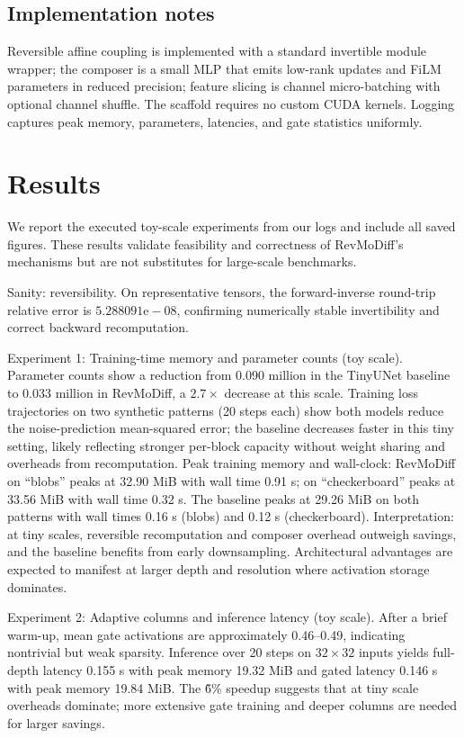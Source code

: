 \documentclass{article}
\begin{document}
\subsection{Implementation notes}
Reversible affine coupling is implemented with a standard invertible module wrapper; the composer is a small MLP that emits low-rank updates and FiLM parameters in reduced precision; feature slicing is channel micro-batching with optional channel shuffle. The scaffold requires no custom CUDA kernels. Logging captures peak memory, parameters, latencies, and gate statistics uniformly.

\section{Results}
We report the executed toy-scale experiments from our logs and include all saved figures. These results validate feasibility and correctness of RevMoDiff’s mechanisms but are not substitutes for large-scale benchmarks.

Sanity: reversibility. On representative tensors, the forward-inverse round-trip relative error is $5.288091\mathrm{e}{-}08$, confirming numerically stable invertibility and correct backward recomputation.

Experiment 1: Training-time memory and parameter counts (toy scale). Parameter counts show a reduction from 0.090 million in the TinyUNet baseline to 0.033 million in RevMoDiff, a $2.7\times$ decrease at this scale. Training loss trajectories on two synthetic patterns (20 steps each) show both models reduce the noise-prediction mean-squared error; the baseline decreases faster in this tiny setting, likely reflecting stronger per-block capacity without weight sharing and overheads from recomputation. Peak training memory and wall-clock: RevMoDiff on ``blobs'' peaks at 32.90 MiB with wall time 0.91 s; on ``checkerboard'' peaks at 33.56 MiB with wall time 0.32 s. The baseline peaks at 29.26 MiB on both patterns with wall times 0.16 s (blobs) and 0.12 s (checkerboard). Interpretation: at tiny scales, reversible recomputation and composer overhead outweigh savings, and the baseline benefits from early downsampling. Architectural advantages are expected to manifest at larger depth and resolution where activation storage dominates.

Experiment 2: Adaptive columns and inference latency (toy scale). After a brief warm-up, mean gate activations are approximately 0.46–0.49, indicating nontrivial but weak sparsity. Inference over 20 steps on $32\times 32$ inputs yields full-depth latency 0.155 s with peak memory 19.32 MiB and gated latency 0.146 s with peak memory 19.84 MiB. The \~6\% speedup suggests that at tiny scale overheads dominate; more extensive gate training and deeper columns are needed for larger savings.
\end{document}
